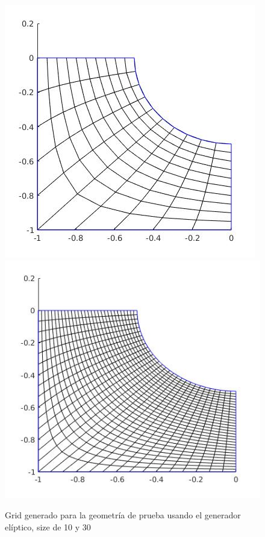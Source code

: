 \documentclass{article}
\begin{document}
\begin{enumerate}
\begin{itemize}
\begin{itemize}
\begin{figure}[H]
			\includegraphics[scale=0.5]{./imgs/img_elliptic_generator_size_10.jpg}
			\includegraphics[scale=0.5]{./imgs/img_elliptic_generator_size_30.jpg}
			\caption{Grid generado para la geometr\'ia de prueba usando el generador el\'iptico, size de 10 y 30}
			\label{fig:img_grid_algebraic}
		\end{figure}
	\end{itemize}



\end{itemize}

\end{enumerate}
\end{document}
